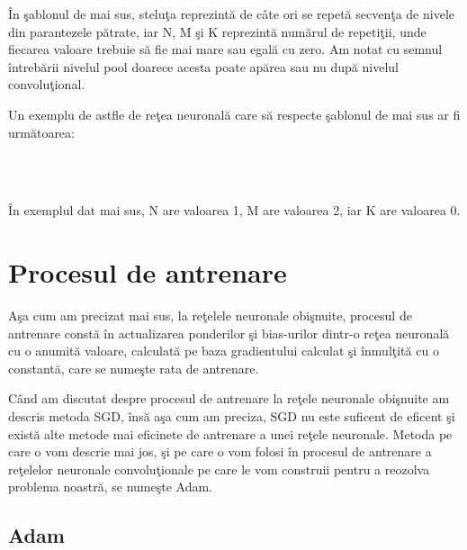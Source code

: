\^{I}n \c{s}ablonul de mai sus, stelu\c{t}a reprezint\u{a} de c\^{a}te ori se repet\u{a} secven\c{t}a de nivele din parantezele p\u{a}trate, iar N, M \c{s}i K reprezint\u{a} num\u{a}rul de repeti\c{t}ii, unde fiecarea valoare trebuie s\u{a} fie mai mare sau egal\u{a} cu zero. Am notat cu semnul \^{i}ntreb\u{a}rii nivelul pool doarece acesta poate ap\u{a}rea sau nu dup\u{a} nivelul convolu\c{t}ional.

\par

Un exemplu de astfle de re\c{t}ea neuronal\u{a} care s\u{a} respecte \c{s}ablonul de mai sus ar fi urm\u{a}toarea:

 \longrightarrow {} \longrightarrow {} \longrightarrow {} \longrightarrow \\ 
\longrightarrow {} \longrightarrow {} \longrightarrow {} \longrightarrow \\ 
\longrightarrow  {} \longrightarrow {}

\^{I}n exemplul dat mai sus, N are valoarea 1, M are valoarea 2, iar K are valoarea 0.

\section{Procesul de antrenare}

A\c{s}a cum am precizat mai sus, la re\c{t}elele neuronale obi\c{s}nuite, procesul de antrenare const\u{a} \^{i}n actualizarea ponderilor \c{s}i bias-urilor dintr-o re\c{t}ea neuronal\u{a} cu o anumit\u{a} valoare, calculat\u{a} pe baza gradientului calculat \c{s}i \^{i}nmul\c{t}it\u{a} cu o constant\u{a}, care se nume\c{s}te rata de antrenare.

C\^{a}nd am discutat despre procesul de antrenare la re\c{t}ele neuronale obi\c{s}nuite am descris metoda SGD, \^{i}ns\u{a} a\c{s}a cum am preciza, SGD nu este suficent de eficent \c{s}i exist\u{a} alte metode mai eficinete de antrenare a unei re\c{t}ele neuronale. Metoda pe care o vom descrie mai jos, \c{s}i pe care o vom folosi \^{i}n procesul de antrenare a re\c{t}elelor neuronale convolu\c{t}ionale pe care le vom construii pentru a reozolva problema noastr\u{a}, se nume\c{s}te Adam.

\subsection{Adam}

